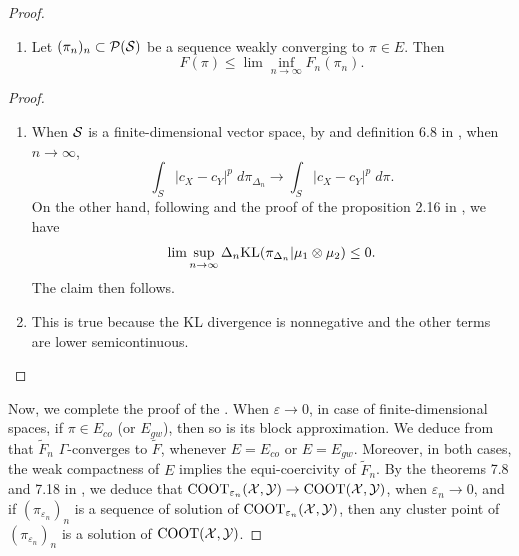 \begin{proof}
\begin{lemma}
\begin{enumerate}
        \item Let $(\pi_n)_n \subset \mathcal P(\mathcal S)$ be a sequence weakly converging to $\pi \in E$. Then
        \begin{equation}
          F(\pi) \leq \lim \inf_{n \to \infty} F_{n}(\pi_n).
        \end{equation}
      \end{enumerate}
    \end{lemma}
    \begin{proof}
      \text{ }
      \begin{enumerate}
        \item When $\mathcal S$ is a finite-dimensional vector space, by  and
        definition 6.8 in \citep{Villani08}, when $n \to \infty$,
        \begin{equation}
          \int_S \vert c_X - c_Y\vert^p \; d\pi_{\Delta_n} \to \int_S \vert c_X - c_Y\vert^p \; d\pi.
        \end{equation}
        On the other hand, following  and the proof of the proposition 2.16 in \citep{Carlier17}, we have
        \begin{equation}
          \lim\sup_{n \to \infty} \Delta_n \text{KL}(\pi_{\Delta_n} \vert \mu_1 \otimes \mu_2) \leq 0.
        \end{equation}
        The claim then follows.

        \item This is true because the KL divergence is nonnegative and the other terms are lower semicontinuous.
      \end{enumerate}
    \end{proof}
    Now, we complete the proof of the .
    When $\varepsilon \to 0$, in case of finite-dimensional spaces, if $\pi \in E_{co}$ (or $E_{gw}$), then so is its block approximation.
    We deduce from  that $\widetilde{F}_{n}$ $\Gamma$-converges to
    $\widetilde{F}$, whenever $E = E_{co}$ or $E = E_{gw}$. Moreover, in both cases, the weak compactness of $E$ implies the equi-coercivity
    of $\widetilde{F}_n$. By the theorems 7.8 and 7.18 in \citep{Maso93}, we deduce that
    $\text{COOT}_{\varepsilon_n}(\mathcal X, \mathcal Y) \to \text{COOT}(\mathcal X, \mathcal Y)$, when $\varepsilon_n \to 0$,
    and if $(\pi_{\varepsilon_n})_{n}$ is a sequence of solution of $\text{COOT}_{\varepsilon_n}(\mathcal X, \mathcal Y)$,
    then any cluster point of $(\pi_{\varepsilon_n})_{n}$ is a solution of $\text{COOT}(\mathcal X, \mathcal Y)$.
  \end{proof}

